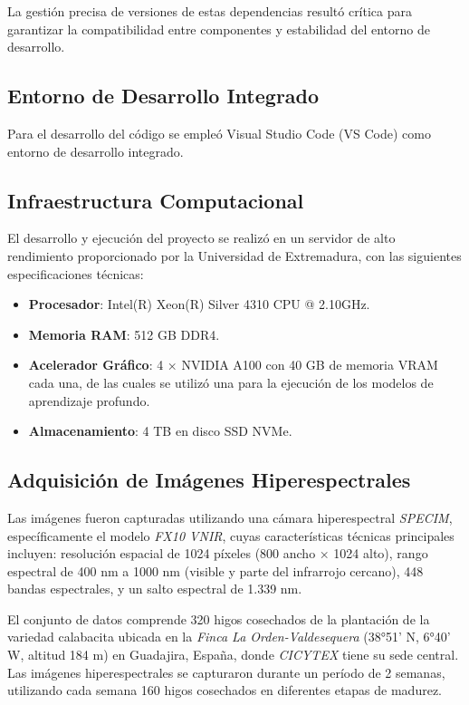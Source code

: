 La gestión precisa de versiones de estas dependencias resultó crítica para garantizar la compatibilidad entre componentes y estabilidad del entorno de desarrollo.

\subsection{Entorno de Desarrollo Integrado}

Para el desarrollo del código se empleó Visual Studio Code (VS Code) como entorno de desarrollo integrado.

\subsection{Infraestructura Computacional}

El desarrollo y ejecución del proyecto se realizó en un servidor de alto rendimiento proporcionado por la Universidad de Extremadura, con las siguientes especificaciones técnicas:

\begin{itemize}
    \item \textbf{Procesador}:  Intel(R) Xeon(R) Silver 4310 CPU @ 2.10GHz.
    \item \textbf{Memoria RAM}: 512 GB DDR4.
    \item \textbf{Acelerador Gráfico}: 4 × NVIDIA A100 con 40 GB de memoria VRAM cada una, de las cuales se utilizó una para la ejecución de los modelos de aprendizaje profundo.
    \item \textbf{Almacenamiento}: 4 TB en disco SSD NVMe.
\end{itemize}

\subsection{Adquisición de Imágenes Hiperespectrales}

Las imágenes fueron capturadas utilizando una cámara hiperespectral \emph{SPECIM}, específicamente el modelo \emph{FX10 VNIR}, cuyas características técnicas principales incluyen: resolución espacial de 1024 píxeles (800 ancho × 1024 alto), rango espectral de 400 nm a 1000 nm (visible y parte del infrarrojo cercano), 448 bandas espectrales, y un salto espectral de 1.339 nm.

\vspace{5mm}

El conjunto de datos comprende 320 higos cosechados de la plantación de la variedad calabacita ubicada en la \emph{Finca La Orden-Valdesequera} (38°51' N, 6°40' W, altitud 184 m) en Guadajira, España, donde \emph{CICYTEX} tiene su sede central. Las imágenes hiperespectrales se capturaron durante un período de 2 semanas, utilizando cada semana 160 higos cosechados en diferentes etapas de madurez.

